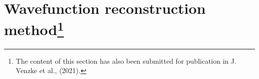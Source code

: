 \section[Wavefunction reconstruction method]{Wavefunction reconstruction method\protect\footnote{The content of this section has also been submitted for publication in J. Venzke et al., (2021).}} %
\label{sec:wavefunction_reconstruction}

